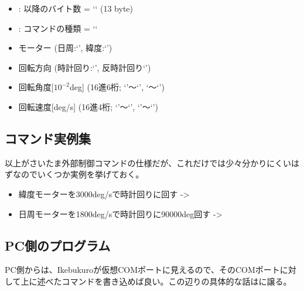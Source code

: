 \documentclass[letterpaper,10pt,dvipdfmx]{sphinxmanual}
\begin{document}
\begin{itemize}
\item {} 
: 以降のバイト数 = `` (13 byte)

\item {} 
: コマンドの種類 = ``

\item {} 
   モーター (日周:‘’, 緯度:‘’)

\item {} 
     回転方向 (時計回り:‘\sphinxcode{+}’, 反時計回り‘\sphinxcode{-}’)

\item {} 
   回転角度{[}\(10^{-2}\)deg{]} (16進6桁; ‘’〜‘’, ‘〜‘’)

\item {} 
   回転速度{[}deg/s{]} (16進4桁; ‘’〜‘’, ‘’〜‘’)

\end{itemize}


\subsection{コマンド実例集}
\label{\detokenize{nissyu-idohen/ikebukuro:}}\label{\detokenize{nissyu-idohen/ikebukuro:id11}}
以上がさいたま外部制御コマンドの仕様だが、これだけでは少々分かりにくいはずなのでいくつか実例を挙げておく。
\begin{itemize}
\item {} 
緯度モーターを3000deg/sで時計回りに回す -\textgreater{} 

\item {} 
日周モーターを1800deg/sで時計回りに90000deg回す -\textgreater{} 

\end{itemize}


\subsection{PC側のプログラム}
\label{\detokenize{nissyu-idohen/ikebukuro:pc}}
PC側からは、Ikebukuroが仮想COMポートに見えるので、そのCOMポートに対して上に述べたコマンドを書き込めば良い。この辺りの具体的な話は{\hyperref[\detokenize{nissyu-idohen/pc-software::doc}]{}}に譲る。
\end{document}
